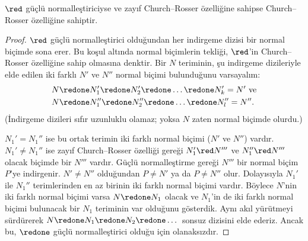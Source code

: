 \begin{lem}
$\red$ güçlü normalleştiriciyse ve zayıf Church--Rosser özelliğine sahipse
Church--Rosser özelliğine sahiptir.
\end{lem}

\begin{proof}
  $\red$ güçlü normalleştirici olduğundan her indirgeme dizisi bir normal
  biçimde sona erer. Bu koşul altında normal biçimlerin tekliği,
  $\red$'in Church--Rosser özelliğine sahip olmasına denktir. Bir $N$
  teriminin, şu indirgeme
  dizileriyle elde edilen iki farklı $N'$ ve $N''$ normal biçimi bulunduğunu
  varsayalım:
  \begin{align*}
  N &\redone N_1' \redone N_2' \redone \dots \redone N_k' = N'
    \text{ ve}\\
  N &\redone N_1'' \redone N_2'' \redone \dots \redone N_l'' = N''.
  \end{align*}
  (İndirgeme dizileri sıfır uzunluklu olamaz; yoksa $N$ zaten normal biçimde
  olurdu.)

  $N_1'=N_1''$ ise bu ortak terimin iki farklı normal biçimi ($N'$ ve
  $N''$) vardır. $N_1'\neq N_1''$ ise zayıf Church--Rosser özelliği gereği
  $N_1'\red N'''$ ve $N_1''\red N'''$ olacak biçimde bir $N'''$ vardır.
  Güçlü normalleştirme gereği $N'''$ bir normal biçim~$P$'ye indirgenir.
  $N'\neq N''$ olduğundan $P\neq N'$ ya da $P\neq N''$ olur. Dolayısıyla
  $N_1'$ ile $N_1''$ terimlerinden en az birinin iki farklı normal biçimi
  vardır. Böylece $N$'nin iki farklı normal biçimi varsa
  $N\redone N_1$ olacak ve $N_1$'in de iki farklı normal biçimi bulunacak
  bir $N_1$ teriminin var olduğunu gösterdik. Aynı akıl yürütmeyi sürdürerek
  $N\redone N_1\redone N_2\redone\dots$ sonsuz dizisini elde ederiz. Ancak
  bu, $\redone$ güçlü normalleştirici olduğu için olanaksızdır.
\end{proof}

